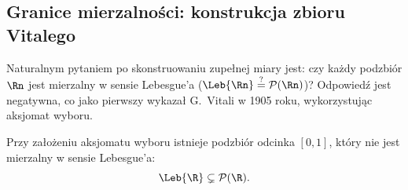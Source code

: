\subsection{Granice mierzalności: konstrukcja zbioru Vitalego}

Naturalnym pytaniem po skonstruowaniu zupełnej miary jest: czy każdy podzbiór $\Rn$ jest mierzalny w sensie Lebesgue'a ($\Leb{\Rn} \stackrel{?}{=} \mathcal{P}(\Rn)$)? Odpowiedź jest negatywna, co jako pierwszy wykazał G.~Vitali w 1905 roku, wykorzystując aksjomat wyboru.

\begin{tw}\label{tw:vitali}
    Przy założeniu aksjomatu wyboru istnieje podzbiór odcinka $[0, 1]$, który nie jest mierzalny w sensie Lebesgue'a:
    \begin{equation*}
        \Leb{\R} \subsetneq \mathcal{P}(\R).
    \end{equation*}
\end{tw}


